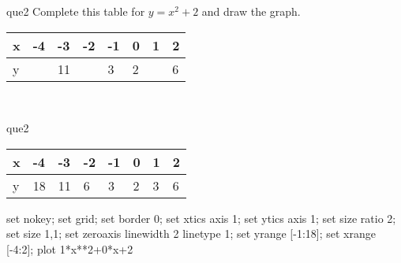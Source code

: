 \documentclass[13.5pt, varwidth=true]{beamer}
\begin{document}
\begin{frame}[shrink=19,fragile]
	\begin{beamercolorbox}[rounded=true, left, shadow=true,wd=14.8cm]{que2}
		 Complete this table for $y = x^{2} + 2$ and draw the graph. \\[0.3cm] \renewcommand{\arraystretch}{1.2}\begin{tabular}{|C|C|C|C|C|C|C|C|} \hline x & -4 & -3 & -2 & -1 & 0 & 1 & 2 \\ \hline y &  & 11 &  & 3 & 2 &  & 6\\ \hline \end{tabular}\\[0.3cm]
	\end{beamercolorbox}
\end{frame}
\begin{frame}[shrink=19,fragile]
	\begin{beamercolorbox}[rounded=true, left, shadow=true,wd=14.8cm]{que2}
		\renewcommand{\arraystretch}{1.2}\begin{tabular}{|C|C|C|C|C|C|C|C|} \hline x & -4 & -3 & -2 & -1 & 0 & 1 & 2 \\ \hline y & 18 & 11 & 6 & 3 & 2 & 3 & 6\\ \hline \end{tabular}\begin{gnuplot}[terminal=pdf] set nokey; set grid; set border 0; set xtics axis 1; set ytics axis 1; set size ratio 2; set size 1,1; set zeroaxis linewidth 2 linetype 1; set yrange [-1:18]; set xrange [-4:2]; plot 1*x**2+0*x+2 \end{gnuplot}
	\end{beamercolorbox}
\end{frame}
\end{document}
